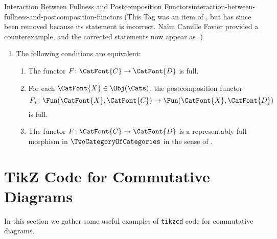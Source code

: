 \begin{oldtag}{Interaction Between Fullness and Postcomposition Functors}{interaction-between-fullness-and-postcomposition-functors}%
    (This Tag was an item of , but has since been removed because its statement is incorrect. Naïm Camille Favier provided a counterexample, and the corrected statements now appear as .)
    \begin{enumerate}
        \item\label{properties-of-full-functors-interaction-with-postcomposition}The following conditions are equivalent:
            \begin{enumerate}
                \item\label{properties-of-full-functors-interaction-with-postcomposition-a}The functor $F\colon\CatFont{C}\to\CatFont{D}$ is full.
                \item\label{properties-of-full-functors-interaction-with-postcomposition-b}For each $\CatFont{X}\in\Obj(\Cats)$, the postcomposition functor
                    \[
                        F_{*}
                        \colon
                        \Fun(\CatFont{X},\CatFont{C})
                        \to
                        \Fun(\CatFont{X},\CatFont{D})
                    \]%
                    is full.
                \item\label{properties-of-full-functors-interaction-with-postcomposition-c}The functor $F\colon\CatFont{C}\to\CatFont{D}$ is a representably full morphism in $\TwoCategoryOfCategories$ in the sense of .
            \end{enumerate}
    \end{enumerate}
\end{oldtag}
\section{TikZ Code for Commutative Diagrams}\label{section-tikz-code-for-commutative-diagrams}
In this section we gather some useful examples of \texttt{tikzcd} code for commutative diagrams.
